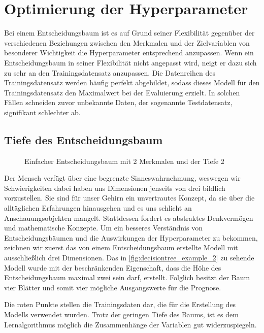 \documentclass[12pt, a4paper]{article}
\begin{document}
\newpage

\section{Optimierung der Hyperparameter}
\label{sec:hyperparameters}

Bei einem Entscheidungsbaum ist es auf Grund seiner Flexibilität gegenüber der verschiedenen Beziehungen zwischen den Merkmalen und der Zielvariablen von besonderer Wichtigkeit die Hyperparameter entsprechend anzupassen. Wenn ein Entscheidungsbaum in seiner Flexibilität nicht angepasst wird, neigt er dazu sich zu sehr an den Trainingsdatensatz anzupassen. Die Datenreihen des Trainingsdatensatz werden häufig perfekt abgebildet, sodass dieses Modell für den Trainingsdatensatz den Maximalwert bei der Evaluierung erzielt. In solchen Fällen schneiden zuvor unbekannte Daten, der sogenannte Testdatensatz, signifikant schlechter ab.

\subsection{Tiefe des Entscheidungsbaum}

\begin{figure}[H]
\centering
\def\svgwidth{350pt}

\caption{Einfacher Entscheidungsbaum mit 2 Merkmalen und der Tiefe 2}
\label{fig:decisiontree_example_2}
\end {figure}

Der Mensch verfügt über eine begrenzte Sinneswahrnehmung, weswegen wir Schwierigkeiten dabei haben uns Dimensionen jenseits von drei bildlich vorzustellen. Sie sind für unser Gehirn ein unvertrautes Konzept, da sie über die alltäglichen Erfahrungen hinausgehen und es uns schlicht an Anschauungsobjekten mangelt. Stattdessen fordert es abstraktes Denkvermögen und mathematische Konzepte. Um ein besseres Verständnis von Entscheidungsbäumen und die Auswirkungen der Hyperparameter zu bekommen, zeichnen wir zuerst das von einem Entscheidungsbaum erstellte Modell mit ausschließlich drei Dimensionen. Das in \autoref{fig:decisiontree_example_2} zu sehende Modell wurde mit der beschränkenden Eigenschaft, dass die Höhe des Entscheidungsbaum maximal zwei sein darf, erstellt. Folglich besitzt der Baum vier Blätter und somit vier mögliche Ausgangswerte für die Prognose. 

Die roten Punkte stellen die Trainingsdaten dar, die für die Erstellung des Modells verwendet wurden. Trotz der geringen Tiefe des Baums, ist es dem Lernalgorithmus möglich die Zusammenhänge der Variablen gut widerzuspiegeln.
\end{document}
